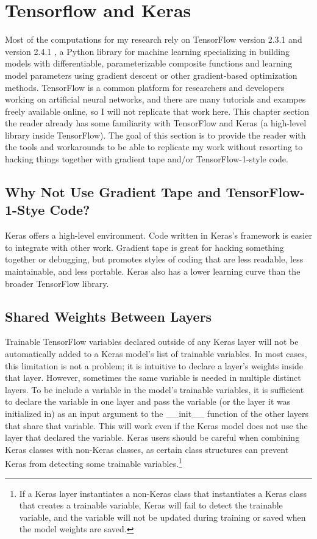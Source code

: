 \section{Tensorflow and Keras}
Most of the computations for my research rely on TensorFlow version 2.3.1 and version 2.4.1 \cite{tensorflow}, a Python library for machine learning specializing in building models with differentiable, parameterizable composite functions and learning model parameters using gradient descent or other gradient-based optimization methods. TensorFlow is a common platform for researchers and developers working on artificial neural networks, and there are many tutorials and exampes freely available online, so I will not replicate that work here. This chapter section the reader already has some familiarity with TensorFlow and Keras \cite{keras} (a high-level library inside TensorFlow). The goal of this section is to provide the reader with the tools and workarounds to be able to replicate my work without resorting to hacking things together with gradient tape and/or TensorFlow-1-style code.

\subsection{Why Not Use Gradient Tape and TensorFlow-1-Stye Code?}
Keras offers a high-level environment. Code written in Keras's framework is easier to integrate with other work. Gradient tape is great for hacking something together or debugging, but promotes styles of coding that are less readable, less maintainable, and less portable. Keras also has a lower learning curve than the broader TensorFlow library.


\subsection{Shared Weights Between Layers}
Trainable TensorFlow variables declared outside of any Keras layer will not be automatically added to a Keras model's list of trainable variables. In most cases, this limitation is not a problem; it is intuitive to declare a layer's weights inside that layer. However, sometimes the same variable is needed in multiple distinct layers. To be include a variable in the model's trainable variables, it is sufficient to declare the variable in one layer and pass the variable (or the layer it was initialized in) as an input argument to the \_\_init\_\_ function of the other layers that share that variable. This will work even if the Keras model does not use the layer that declared the variable. Keras users should be careful when combining Keras classes with non-Keras classes, as certain class structures can prevent Keras from detecting some trainable variables.\footnote{If a Keras layer instantiates a non-Keras class that instantiates a Keras class that creates a trainable variable, Keras will fail to detect the trainable variable, and the variable will not be updated during training or saved when the model weights are saved.}

